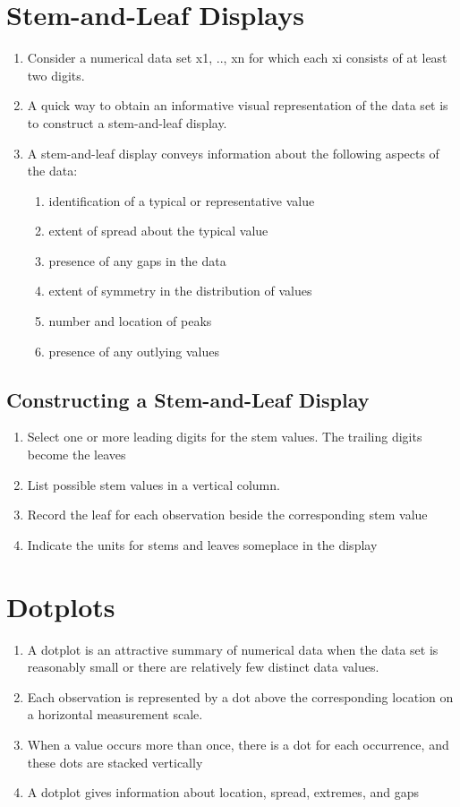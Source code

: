 \section{Stem-and-Leaf Displays \cite{ism-2,wiki-Stem-and-leaf_display}}\label{Stem-and-Leaf Displays}
\begin{enumerate}
    \item Consider a numerical data set x1, .., xn for which each xi consists of at least two digits. 
    \item A quick way to obtain an informative visual representation of the data set is to construct a stem-and-leaf display.
    \item A stem-and-leaf display conveys information about the following aspects of the data:
    \begin{enumerate}
        \item identification of a typical or representative value
        \item extent of spread about the typical value
        \item presence of any gaps in the data
        \item extent of symmetry in the distribution of values
        \item number and location of peaks
        \item presence of any outlying values
    \end{enumerate}
\end{enumerate}
\subsection{Constructing a Stem-and-Leaf Display}
\begin{enumerate}
    \item Select one or more leading digits for the stem values. The trailing digits become the leaves
    \item List possible stem values in a vertical column.
    \item Record the leaf for each observation beside the corresponding stem value
    \item Indicate the units for stems and leaves someplace in the display
\end{enumerate}

\section{Dotplots \cite{wiki-dotplot,ism-2}}\label{dotplots}
\begin{enumerate}
    \item A dotplot is an attractive summary of numerical data when the data set is reasonably small or there are relatively few distinct data values. 
    \item Each observation is represented by a dot above the corresponding location on a horizontal measurement scale. 
    \item When a value occurs more than once, there is a dot for each occurrence, and these dots are stacked vertically
    \item A dotplot gives information about location, spread, extremes, and gaps
\end{enumerate}

